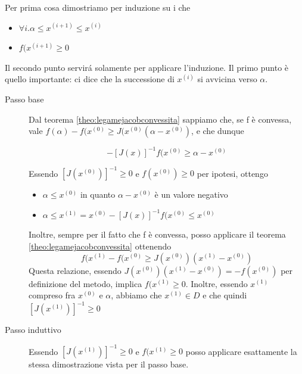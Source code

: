 \begin{thproof}
Per prima cosa dimostriamo per induzione su i che
\begin{itemize}
\item $ \forall i.\alpha \leq x^{(i+1)} \leq x^{(i)} $
\item $ f(x^{(i+1)} \geq 0 $
\end{itemize}
Il secondo punto servir\'a solamente per applicare l'induzione. Il primo punto \`e  quello importante: ci dice che la successione di $ x^{(i)} $ si avvicina verso $ \alpha $.

\begin{description}
\item[Passo base] Dal teorema \ref{theo:legamejacobconvessita} sappiamo che, se f \`e  convessa, vale $ f(\alpha) - f(x^{(0)} \geq J(x^{(0)}(\alpha - x^{(0)}) $, e che dunque

\begin{equation}
-[J(x)]^{-1}f(x^{(0)} \geq \alpha - x^{(0)}
\label{eqn:nrfunzconv}
\end{equation}

Essendo $ [J(x^{(0)})]^{-1} \geq 0 $ e $ f(x^{(0)}) \geq 0 $ per ipotesi, ottengo

\begin{itemize}
\item $ \alpha \leq x^{(0)} $ in quanto $ \alpha - x^{(0)} $ \`e  un valore negativo
\item $ \alpha \leq x^{(1)} = x^{(0)}-[J(x)]^{-1}f(x^{(0)} \leq x^{(0)} $
\end{itemize}

Inoltre, sempre per il fatto che f \`e  convessa, posso applicare il teorema \ref{theo:legamejacobconvessita} ottenendo
\[ f(x^{(1)} - f(x^{(0)} \geq J(x^{(0)})(x^{(1)} - x^{(0)}) \]
Questa relazione, essendo $ J(x^{(0)})(x^{(1)} - x^{(0)}) = -f(x^{(0)}) $ per definizione del metodo, implica $ f(x^{(1)} \geq 0 $. Inoltre, essendo $ x^{(1)} $ compreso fra $ x^{(0)} $ e $ \alpha $, abbiamo che $ x^{(1)} \in D $ e che quindi $ [J(x^{(1)})]^{-1} \geq 0 $

\item[Passo induttivo] Essendo $ [J(x^{(1)})]^{-1} \geq 0 $ e $ f(x^{(1)} \geq 0 $ posso applicare esattamente la stessa dimostrazione vista per il passo base.
\end{description}


\end{thproof}
